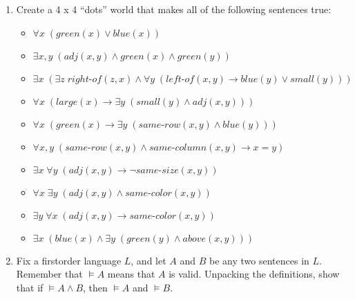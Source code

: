 \documentclass[letterpaper,10pt,english]{sphinxmanual}
\begin{document}
\begin{enumerate}
\begin{itemize}
\end{itemize}

\item {} 
\sphinxAtStartPar
Create a 4 x 4 “dots” world that makes all of the following sentences
true:
\begin{itemize}
\item {} 
\sphinxAtStartPar
\(\forall x \; (\mathit{green}(x) \vee \mathit{blue}(x))\)

\item {} 
\sphinxAtStartPar
\(\exists x, y \; (\mathit{adj}(x, y) \wedge \mathit{green}(x) \wedge \mathit{green}(y))\)

\item {} 
\sphinxAtStartPar
\(\exists x \; (\exists z \; \mathit{right{\mathord{\mbox{-}}}of}(z, x) \wedge \forall y \; (\mathit{left{\mathord{\mbox{-}}}of}(x, y) \to \mathit{blue}(y) \vee \mathit{small}(y)))\)

\item {} 
\sphinxAtStartPar
\(\forall x \; (\mathit{large}(x) \to \exists y \; (\mathit{small}(y) \wedge \mathit{adj}(x, y)))\)

\item {} 
\sphinxAtStartPar
\(\forall x \; (\mathit{green}(x) \to \exists y \; (\mathit{same{\mathord{\mbox{-}}}row}(x, y) \wedge \mathit{blue}(y)))\)

\item {} 
\sphinxAtStartPar
\(\forall x, y \; (\mathit{same{\mathord{\mbox{-}}}row}(x, y) \wedge \mathit{same\mathord{\mbox{-}} column}(x, y) \to x = y)\)

\item {} 
\sphinxAtStartPar
\(\exists x \; \forall y \; (\mathit{adj}(x, y) \to \neg \mathit{same{\mathord{\mbox{-}}}size}(x, y))\)

\item {} 
\sphinxAtStartPar
\(\forall x \; \exists y \; (\mathit{adj}(x, y) \wedge \mathit{same{\mathord{\mbox{-}}}color}(x, y))\)

\item {} 
\sphinxAtStartPar
\(\exists y \; \forall x \; (\mathit{adj}(x, y) \to \mathit{same{\mathord{\mbox{-}}}color}(x, y))\)

\item {} 
\sphinxAtStartPar
\(\exists x \; (\mathit{blue}(x) \wedge \exists y \; (\mathit{green}(y) \wedge \mathit{above}(x, y)))\)

\end{itemize}

\item {} 
\sphinxAtStartPar
Fix a first\sphinxhyphen{}order language \(L\), and let \(A\) and \(B\) be any two sentences in \(L\). Remember that \(\vDash A\) means that \(A\) is valid. Unpacking the definitions, show that if \(\vDash A \wedge B\), then \(\vDash A\) and \(\vDash B\).


\end{enumerate}
\end{document}
